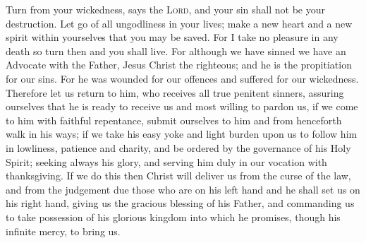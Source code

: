 \documentclass[a5paper]{liturgy}
\begin{document}
\begin{leader}
  Turn from your wickedness, says the \textsc{Lord}, and your sin shall not be your destruction.
  Let go of all ungodliness in your lives; make a new heart and a new spirit within yourselves that you may be saved.
  For I take no pleasure in any death so turn then and you shall live.
  For although we have sinned we have an Advocate with the Father, Jesus Christ the righteous; and he is the propitiation for our sins.
  For he was wounded for our offences and suffered for our wickedness.
  Therefore let us return to him, who receives all true penitent sinners, assuring ourselves that he is ready to receive us and most willing to pardon us, if we come to him with faithful repentance, submit ourselves to him and from henceforth walk in his ways; if we take his easy yoke and light burden upon us to follow him in lowliness, patience and charity, and be ordered by the governance of his Holy Spirit; seeking always his glory, and serving him duly in our vocation with thanksgiving.
  If we do this then Christ will deliver us from the curse of the law, and from the judgement due those who are on his left hand and he shall set us on his right hand, giving us the gracious blessing of his Father, and commanding us to take possession of his glorious kingdom into which he promises, though his infinite mercy, to bring us. 
\end{leader}
\end{document}
